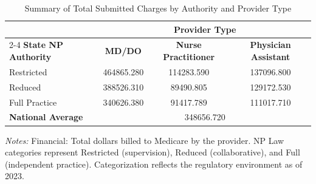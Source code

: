 \begin{table}[htbp]
    \centering
    \caption{Summary of Total Submitted Charges by Authority and Provider Type}
    \label{tab:tot_sbmtd_chrg_provtype}
    \vspace{0.2cm}
    \begin{tabular}{lccc}
        \toprule
        & \multicolumn{3}{c}{\textbf{Provider Type}} \\
        \cmidrule(lr){2-4}
        \textbf{State NP Authority} & \textbf{MD/DO} & \textbf{Nurse Practitioner} & \textbf{Physician Assistant} \\
        \midrule
        Restricted & 464865.280 & 114283.590 & 137096.800 \\
        Reduced & 388526.310 & 89490.805 & 129172.530 \\
        Full Practice & 340626.380 & 91417.789 & 111017.710 \\
        \midrule
        \textbf{National Average} & \multicolumn{3}{c}{348656.720} \\
        \bottomrule
    \end{tabular}
    \vspace{0.1cm}
    \begin{minipage}{0.85\textwidth}
        \footnotesize \textit{Notes:} Financial: Total dollars billed to Medicare by the provider. NP Law categories represent Restricted (supervision), Reduced (collaborative), and Full (independent practice). Categorization reflects the regulatory environment as of 2023.
    \end{minipage}
\end{table}